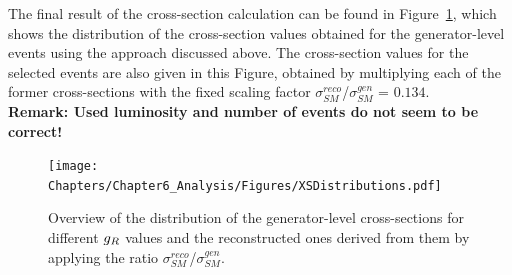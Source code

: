 The final result of the cross-section calculation can be found in Figure~\ref{fig::XSDistr}, which shows the distribution of the cross-section values obtained for the generator-level events using the approach discussed above. The cross-section values for the selected events are also given in this Figure, obtained by multiplying each of the former cross-sections with the fixed scaling factor $\sigma_{SM}^{reco}$/$\sigma_{SM}^{gen}$ = $0.134$.
\\
\textbf{Remark: Used luminosity and number of events do not seem to be correct!}
\begin{figure}[h!t]
 \centering
 \texttt{[image: Chapters/Chapter6\_Analysis/Figures/XSDistributions.pdf]}
 \caption{Overview of the distribution of the generator-level cross-sections for different $g_{R}$ values and the reconstructed ones derived from them by applying the ratio $\sigma_{SM}^{reco}$/$\sigma_{SM}^{gen}$.} \label{fig::XSDistr}
\end{figure}

